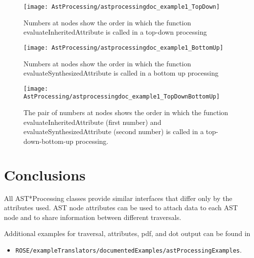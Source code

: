 \begin{figure}
\texttt{[image: AstProcessing/astprocessingdoc\_example1\_TopDown]}
\caption{Numbers at nodes show the order in which the function evaluateInheritedAttribute is called in a top-down processing}
\label{AstProcessing:TopDownAst}
\end{figure}

\begin{figure}
\texttt{[image: AstProcessing/astprocessingdoc\_example1\_BottomUp]}
\caption{Numbers at nodes show the order in which the function evaluateSynthesizedAttribute is called in a bottom up processing}
\label{AstProcessing:BottomUpAst}
\end{figure}

\begin{figure}
\texttt{[image: AstProcessing/astprocessingdoc\_example1\_TopDownBottomUp]}
\caption{The pair of numbers at nodes shows the order in which the function
    evaluateInheritedAttribute (first number) and evaluateSynthesizedAttribute (second number)
    is called in a top-down-bottom-up processing.}
\label{AstProcessing:TopDownBottomUpAst}
\end{figure}
\section{Conclusions}

All AST*Processing classes provide similar interfaces that differ only by the attributes used. AST node attributes can be used to attach data to each AST node and to share information between different traversals. 

Additional examples for traversal, attributes, pdf, and dot output can be found in 
\begin{itemize}
\item \verb+ROSE/exampleTranslators/documentedExamples/astProcessingExamples+.
\end{itemize}

